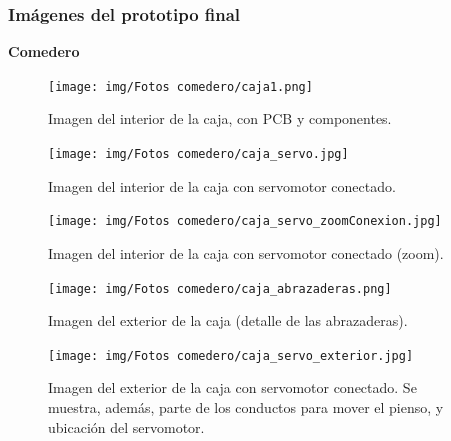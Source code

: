 \documentclass[12pt]{article}
\begin{document}
	\pagebreak
	

	
	\subsubsection{Imágenes del prototipo final}
	\noindent \textbf{Comedero} \\
	
	\begin{figure}[h]
		\begin{center}
			\texttt{[image: img/Fotos comedero/caja1.png]}
			\caption{Imagen del interior de la caja, con PCB y componentes. }
			\label{Prototipo: caja1}
		\end{center}
	\end{figure}
	
	\pagebreak
	
	\begin{figure}[h]
		\begin{center}
			\texttt{[image: img/Fotos comedero/caja\_servo.jpg]}
			\caption{Imagen del interior de la caja con servomotor conectado.}
			\label{Prototipo: caja con servo}
		\end{center}
	\end{figure}

	\pagebreak

	\begin{figure}[h]
		\begin{center}
			\texttt{[image: img/Fotos comedero/caja\_servo\_zoomConexion.jpg]}
			\caption{Imagen del interior de la caja con servomotor conectado (zoom).}
			\label{Prototipo: caja con servo (zoom)}
		\end{center}
	\end{figure}
	
	\pagebreak

	\begin{figure}[h]
		\begin{center}
			\texttt{[image: img/Fotos comedero/caja\_abrazaderas.png]}
			\caption{Imagen del exterior de la caja (detalle de las abrazaderas).}
			\label{Prototipo: caja con abrazaderas (detalle)}
		\end{center}
	\end{figure}

	\pagebreak
	
	\begin{figure}[h]
		\begin{center}
			\texttt{[image: img/Fotos comedero/caja\_servo\_exterior.jpg]}
			\caption{Imagen del exterior de la caja con servomotor conectado. Se muestra, además, parte de los conductos para mover el pienso, y ubicación del servomotor.}
			\label{Prototipo: caja con servo (exterior)}
		\end{center}
	\end{figure}
\end{document}
